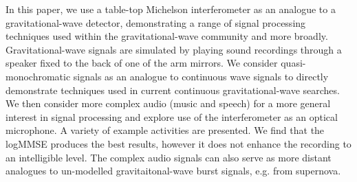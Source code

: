 \documentclass[paper-main.tex]{subfiles}
\begin{document}
In this paper, we use a table-top Michelson interferometer as an analogue to a gravitational-wave detector, demonstrating a range of signal processing techniques used within the gravitational-wave community and more broadly. 
Gravitational-wave signals are simulated by playing sound recordings through a speaker fixed to the back of one of the arm mirrors. 
We consider quasi-monochromatic signals as an analogue to continuous wave signals to directly demonstrate techniques used in current continuous gravitational-wave searches.
We then consider more complex audio (music and speech) for a more general interest in signal processing and explore use of the interferometer as an optical microphone. 
A variety of example activities are presented. 
We find that the logMMSE produces the best results, however it does not enhance the recording to an intelligible level. 
The complex audio signals can also serve as more distant analogues to un-modelled gravitaitonal-wave burst signals, e.g. from supernova. 
\end{document}
